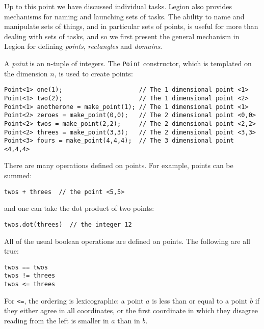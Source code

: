 Up to this point we have discussed individual tasks.  Legion also provides mechanisms for
naming and launching sets of tasks.  The ability to name and manipulate sets of things, and 
in particular sets of points, is useful for
more than dealing with sets of tasks, and so we first present the general mechanism in
Legion for defining {\em points}, {\em rectangles} and {\em domains}.

A {\em point} is an n-tuple of integers.  The {\tt Point} constructor, which is templated on the
dimension $n$,  is used to create points:
\begin{verbatim}
Point<1> one(1);                     // The 1 dimensional point <1>
Point<1> two(2);                     // The 1 dimensional point <2>
Point<1> anotherone = make_point(1); // The 1 dimensional point <1>
Point<2> zeroes = make_point(0,0);   // The 2 dimensional point <0,0>
Point<2> twos = make_point(2,2);     // The 2 dimensional point <2,2>
Point<2> threes = make_point(3,3);   // The 2 dimensional point <3,3>
Point<3> fours = make_point(4,4,4);  // The 3 dimensional point <4,4,4>
\end{verbatim}

There are many operations defined on points.  For example, points can be summed:
\begin{verbatim}
twos + threes  // the point <5,5>
\end{verbatim}
and one can take the dot product of two points:             
\begin{verbatim}
twos.dot(threes)  // the integer 12
\end{verbatim}
All of the usual boolean operations are defined on points.  The following are all true:
\begin{verbatim}
twos == twos   
twos != threes 
twos <= threes 
\end{verbatim}
For \verb+<=+, the ordering is lexicographic: a point $a$ is less than or equal to a point $b$ if they either agree
in all coordinates, or the first coordinate in which they disagree reading from the left is smaller in $a$ than in $b$.

